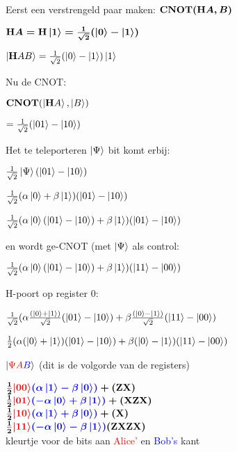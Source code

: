 \documentclass[../main.tex]{subfiles}
\begin{document}
Eerst een verstrengeld paar maken: $\port{CNOT}(\port{H}A, B)$

$\port{H}A=\port{H}\ket{1}=\frac{1}{\sqrt{2}}(\ket{0}-\ket{1})$

$\ket{\port{H}A B}= \frac{1}{\sqrt{2}}(\ket{0}-\ket{1})\ket{1}$

Nu de CNOT:

$\port{CNOT}(\ket{\port{H}A},\ket{ B})$

$= \frac{1}{\sqrt{2}}(\ket{01}-\ket{10})$

Het te teleporteren $\ket{\Psi}$ bit komt erbij:

$ \frac{1}{\sqrt{2}}\ket{\Psi}(\ket{01}-\ket{10})$


$ \frac{1}{\sqrt{2}}(\alpha\ket{0}+\beta\ket{1})(\ket{01}-\ket{10})$


$ \frac{1}{\sqrt{2}}(\alpha\ket{0}(\ket{01}-\ket{10})+\beta\ket{1})(\ket{01}-\ket{10})$

en wordt ge-CNOT (met $\ket{\Psi}$ als control:

$ \frac{1}{\sqrt{2}}(\alpha\ket{0}(\ket{01}-\ket{10})+\beta\ket{1})(\ket{11}-\ket{00})$

H-poort op register 0:

$ \frac{1}{\sqrt{2}}(\alpha\frac{(\ket{0}+\ket{1})}{\sqrt{2}}(\ket{01}-\ket{10})+\beta\frac{(\ket{0}-\ket{1})}{\sqrt{2}}(\ket{11}-\ket{00})$


$ \frac{1}{2}(\alpha(\ket{0}+\ket{1})(\ket{01}-\ket{10})+\beta(\ket{0}-\ket{1})(\ket{11}-\ket{00})$

$\ket{\textcolor{red}{\Psi A} \textcolor{blue}{B}}$ (dit is de volgorde van de registers)

$\frac{1}{2}\textcolor{red}{\ket{00}}\textcolor{blue}{(\alpha\ket{1}-\beta\ket{0})}+   (\port{ZX})$\\
$\frac{1}{2}\textcolor{red}{\ket{01}}\textcolor{blue}{(-\alpha\ket{0}+\beta\ket{1})}+  (\port{XZX})$\\
$\frac{1}{2}\textcolor{red}{\ket{10}}\textcolor{blue}{(\alpha\ket{1}+\beta\ket{0})}+   (\port{X})$\\
$\frac{1}{2}\textcolor{red}{\ket{11}}\textcolor{blue}{(-\alpha\ket{0}-\beta\ket{1})}   (\port{ZXZX})$\\

kleurtje voor de bits aan \textcolor{red}{Alice'} en \textcolor{blue}{Bob's} kant
\end{document}
